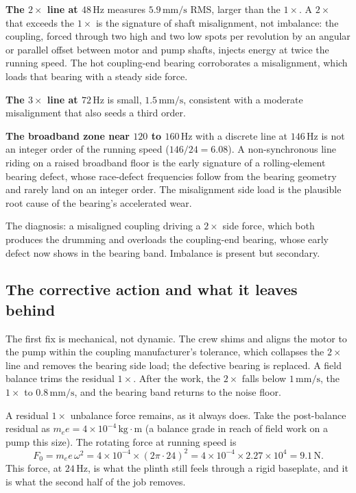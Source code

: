 \textbf{The $2\times$ line at $48\,\si{\hertz}$} measures $5.9\,\si{
\milli\meter\per\second}$ RMS, larger than the $1\times$. A $2\times$
that exceeds the $1\times$ is the signature of shaft misalignment, not
imbalance: the coupling, forced through two high and two low spots per
revolution by an angular or parallel offset between motor and pump
shafts, injects energy at twice the running speed. The hot
coupling-end bearing corroborates a misalignment, which loads that
bearing with a steady side force.

\textbf{The $3\times$ line at $72\,\si{\hertz}$} is small, $1.5\,\si{
\milli\meter\per\second}$, consistent with a moderate misalignment that
also seeds a third order.

\textbf{The broadband zone near $120$ to $160\,\si{\hertz}$} with a
discrete line at $146\,\si{\hertz}$ is not an integer order of the
running speed ($146/24 = 6.08$). A non-synchronous line riding on a
raised broadband floor is the early signature of a rolling-element
bearing defect, whose race-defect frequencies follow from the bearing
geometry and rarely land on an integer order. The misalignment side
load is the plausible root cause of the bearing's accelerated wear.

The diagnosis: a misaligned coupling driving a $2\times$ side force,
which both produces the drumming and overloads the coupling-end
bearing, whose early defect now shows in the bearing band. Imbalance is
present but secondary.

\subsection{The corrective action and what it leaves behind}

The first fix is mechanical, not dynamic. The crew shims and aligns the
motor to the pump within the coupling manufacturer's tolerance, which
collapses the $2\times$ line and removes the bearing side load; the
defective bearing is replaced. A field balance trims the residual
$1\times$. After the work, the $2\times$ falls below $1\,\si{\milli
\meter\per\second}$, the $1\times$ to $0.8\,\si{\milli\meter\per
\second}$, and the bearing band returns to the noise floor.

A residual $1\times$ unbalance force remains, as it always does. Take
the post-balance residual as $m_e e = 4\times 10^{-4}\,\si{\kilogram}
\cdot\si{\meter}$ (a balance grade in reach of field work on a pump
this size). The rotating force at running speed is
\[
F_0 = m_e e\,\omega^2 = 4\times 10^{-4}\times (2\pi\cdot 24)^2 = 4
\times 10^{-4}\times 2.27\times 10^4 = 9.1\,\text{N}.
\]
This force, at $24\,\si{\hertz}$, is what the plinth still feels through
a rigid baseplate, and it is what the second half of the job removes.

